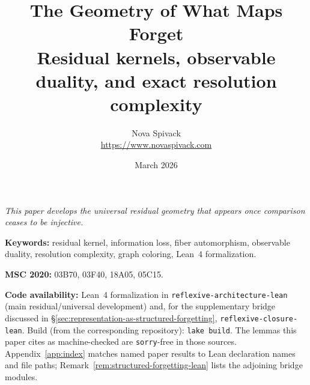 \documentclass[11pt,a4paper]{article}
\title{\textbf{The Geometry of What Maps Forget}\\[6pt]
\large Residual kernels, observable duality, and exact resolution complexity}
\author{Nova Spivack\\[0.3em]
{\small \url{https://www.novaspivack.com}}}
\date{March 2026}
\theoremstyle{plain}
\theoremstyle{definition}
\theoremstyle{remark}
\begin{document}
\maketitle
\NovaZenodoAfterTitle

\noindent\emph{This paper develops the universal residual geometry that appears once comparison ceases to be injective.}
\medskip

\noindent\textbf{Keywords:} residual kernel, information loss, fiber automorphism,
observable duality, resolution complexity, graph coloring, Lean~4 formalization.

\noindent\textbf{MSC 2020:} 03B70, 03F40, 18A05, 05C15.

\noindent\textbf{Code availability:} Lean~4 formalization in
\texttt{reflexive-architecture-lean} (main residual/universal development) and,
for the supplementary bridge discussed in \S\ref{sec:representation-as-structured-forgetting},
\texttt{reflexive-closure-lean}. Build (from the corresponding repository): \texttt{lake build}.
The lemmas this paper cites as machine-checked are \texttt{sorry}-free in those sources.
Appendix~\ref{app:index} matches named paper results to Lean declaration names and file paths;
Remark~\ref{rem:structured-forgetting-lean} lists the adjoining bridge modules.
\end{document}
